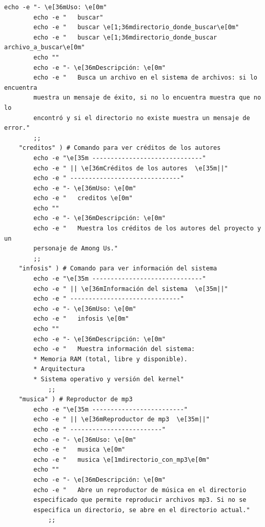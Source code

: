 \documentclass[12pt,a4paper]{article}
\begin{document}
\begin{lstlisting}[style=BashInputStyle]
        echo -e "- \e[36mUso: \e[0m"
        echo -e "   buscar"
        echo -e "   buscar \e[1;36mdirectorio_donde_buscar\e[0m"
        echo -e "   buscar \e[1;36mdirectorio_donde_buscar archivo_a_buscar\e[0m"
        echo ""
        echo -e "- \e[36mDescripción: \e[0m"
        echo -e "   Busca un archivo en el sistema de archivos: si lo encuentra
        muestra un mensaje de éxito, si no lo encuentra muestra que no lo 
        encontró y si el directorio no existe muestra un mensaje de error."
        ;;
    "creditos" ) # Comando para ver créditos de los autores
        echo -e "\e[35m ------------------------------"
        echo -e " || \e[36mCréditos de los autores  \e[35m||"
        echo -e " ------------------------------"
        echo -e "- \e[36mUso: \e[0m"
        echo -e "   creditos \e[0m"
        echo ""
        echo -e "- \e[36mDescripción: \e[0m"
        echo -e "   Muestra los créditos de los autores del proyecto y un
        personaje de Among Us."
        ;;
    "infosis" ) # Comando para ver información del sistema
        echo -e "\e[35m ------------------------------"
        echo -e " || \e[36mInformación del sistema  \e[35m||"
        echo -e " ------------------------------"
        echo -e "- \e[36mUso: \e[0m"
        echo -e "   infosis \e[0m"
        echo ""
        echo -e "- \e[36mDescripción: \e[0m"
        echo -e "   Muestra información del sistema:
        * Memoria RAM (total, libre y disponible).
        * Arquitectura
        * Sistema operativo y versión del kernel"
            ;;
    "musica" ) # Reproductor de mp3
        echo -e "\e[35m -------------------------"
        echo -e " || \e[36mReproductor de mp3  \e[35m||"
        echo -e " -------------------------"
        echo -e "- \e[36mUso: \e[0m"
        echo -e "   musica \e[0m"
        echo -e "   musica \e[1mdirectorio_con_mp3\e[0m"
        echo ""
        echo -e "- \e[36mDescripción: \e[0m"
        echo -e "   Abre un reproductor de música en el directorio 
        especificado que permite reproducir archivos mp3. Si no se
        especifica un directorio, se abre en el directorio actual."
            ;;
        

\end{lstlisting}
\end{document}
